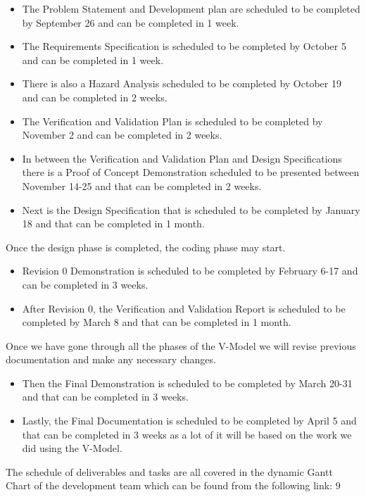 \documentclass[12pt, titlepage]{article}
\begin{document}
\begin{itemize}
    \item The Problem Statement and Development plan are scheduled to be completed by September 26 and can be completed in 1 week. 
    \item The Requirements Specification is scheduled to be completed by October 5 and can be completed in 1 week. 
    \item There is also a Hazard Analysis scheduled to be completed by October 19 and can be completed in 2 weeks. 
    \item The Verification and Validation Plan is scheduled to be completed by November 2 and can be completed in 2 weeks. 
    \item In between the Verification and Validation Plan and Design Specifications there is a Proof of Concept Demonstration scheduled to be presented between November 14-25 and that can be completed in 2 weeks. 
    \item Next is the Design Specification that is scheduled to be completed by January 18 and that can be completed in 1 month.
\end{itemize}

Once the design phase is completed, the coding phase may start. 
\begin{itemize}
    \item Revision 0 Demonstration is scheduled to be completed by February 6-17 and can be completed in 3 weeks.
    \item After Revision 0, the Verification and Validation Report is scheduled to be completed by March 8 and that can be completed in 1 month.
\end{itemize}

Once we have gone through all the phases of the V-Model we will revise previous documentation and make any necessary changes. 

\begin{itemize}
    \item Then the Final Demonstration is scheduled to be completed by March 20-31 and that can be completed in 3 weeks.
    \item Lastly, the Final Documentation is scheduled to be completed by April 5 and that can be completed in 3 weeks as a lot of it will be based on the work we did using the V-Model.
\end{itemize}

The schedule of deliverables and tasks are all covered in the dynamic Gantt Chart of the development team which can be found from the following link:
9
\end{document}
